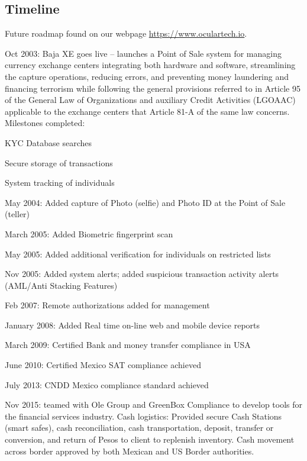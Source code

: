 \documentclass[a4paper]{article}
\let\tempone\itemize
\let\temptwo\enditemize
\renewenvironment{itemize}{\tempone\addtolength{\itemsep}{-5pt}}{\temptwo}
\begin{document}
\subsection{Timeline}
Future roadmap found on our webpage \url{https://www.oculartech.io}.
\begin{itemize}
\item Oct 2003: Baja XE goes live – launches a Point of Sale system for managing currency exchange centers integrating both hardware and software, streamlining the capture operations, reducing errors, and preventing money laundering and financing terrorism while following the general provisions referred to in Article 95 of the General Law of Organizations and auxiliary Credit Activities (LGOAAC) applicable to the exchange centers that Article 81-A of the same law concerns.\newline
\\
Milestones completed:
\begin{itemize}
  \item KYC Database searches
  \item Secure storage of transactions
  \item System tracking of individuals
\end{itemize}
\item May 2004: Added capture of Photo (selfie) and Photo ID at the Point of Sale (teller)
\item March 2005: Added Biometric fingerprint scan
\item May 2005: Added additional verification for individuals on restricted lists
\item Nov 2005: Added system alerts; added suspicious transaction activity alerts (AML/Anti Stacking Features)
\item Feb 2007: Remote authorizations added for management
\item January 2008: Added Real time on-line web and mobile device reports
\item March 2009: Certified Bank and money transfer compliance in USA
\item June 2010: Certified Mexico SAT compliance achieved
\item July 2013: CNDD Mexico compliance standard achieved
\item Nov 2015: teamed with Ole Group and GreenBox Compliance to develop tools for the financial services industry. Cash logistics: Provided secure Cash Stations (smart safes), cash reconciliation, cash transportation, deposit, transfer or conversion, and return of Pesos to client to replenish inventory. Cash movement across border approved by both Mexican and US Border authorities.

\end{itemize}
\end{document}

